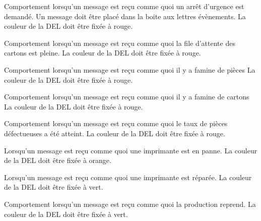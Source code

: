 {Comportement lorsqu'un message est reçu comme quoi un arrêt d'urgence est
    demandé.}
{Un message doit être placé dans la boite aux lettres évènements. La couleur de
    la DEL doit être fixée à rouge.}

{Comportement lorsqu'un message est reçu comme quoi la file d'attente des
    cartons est pleine.}
{La couleur de la DEL doit être fixée à rouge.}

{Comportement lorsqu'un message est reçu comme quoi il y a famine de pièces}
{La couleur de la DEL doit être fixée à rouge.}

{Comportement lorsqu'un message est reçu comme quoi il y a famine de cartons}
{La couleur de la DEL doit être fixée à rouge.}

{Comportement lorsqu'un message est reçu comme quoi le taux de pièces
    défectueuses a été atteint.}
{La couleur de la DEL doit être fixée à rouge.}

{Lorsqu'un message est reçu comme quoi une imprimante est en panne.}
{La couleur de la DEL doit être fixée à orange.}

{Lorsqu'un message est reçu comme quoi une imprimante est réparée.}
{La couleur de la DEL doit être fixée à vert.}

{Comportement lorsqu'un message est reçu comme quoi la production reprend.}
{La couleur de la DEL doit être fixée à vert.}

